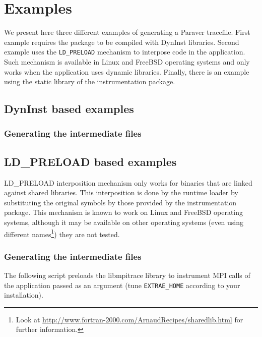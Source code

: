 \chapter{Examples}\label{cha:Examples}

We present here three different examples of generating a Paraver tracefile. First example requires the package to be compiled with DynInst libraries. Second example uses the {\tt LD\_PRELOAD} mechanism to interpose code in the application. Such mechanism is available in Linux and FreeBSD operating systems and only works when the application uses dynamic libraries. Finally, there is an example using the static library of the instrumentation package.

\section{DynInst based examples}\label{sec:Examples_DynInst}

\subsection{Generating the intermediate files}\label{subsec:Examples_DynInst_Intermediate}

\section{LD\_PRELOAD based examples}\label{sec:Examples_LDPRELOAD}

LD\_PRELOAD interposition mechanism only works for binaries that are linked against shared libraries. This interposition is done by the runtime loader by substituting the original symbols by those provided by the instrumentation package. This mechanism is known to work on Linux and FreeBSD operating systems, although it may be available on other operating systems (even using different names\footnote{Look at \url{http://www.fortran-2000.com/ArnaudRecipes/sharedlib.html} for further information.}) they are not tested.

\subsection{Generating the intermediate files}\label{subsec:Examples_LDPRELOAD_Intermediate}

The following script preloads the libmpitrace library to instrument MPI calls of the application passed as an argument (tune {\tt EXTRAE\_HOME} according to your installation).

